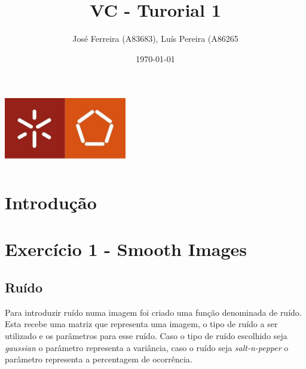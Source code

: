 \documentclass[a4paper]{report}
\begin{document}
\title{VC - Turorial 1}
\author{José Ferreira (A83683), Luís Pereira (A86265}
\date{\today}

\begin{center}
    \begin{minipage}{0.75\linewidth}
        \centering
        \includegraphics[width=0.4\textwidth]{images/eng.jpeg}\par\vspace{1cm}
        \vspace{1.5cm}
        \href{https://www.uminho.pt/PT}
        {\color{black}{\scshape\LARGE Universidade do Minho}} \par
        \vspace{1cm}
        \href{https://www.di.uminho.pt/}
        {\color{black}{\scshape\Large Departamento de Informática}} \par
        \vspace{1.5cm}
        \maketitle
    \end{minipage}
\end{center}

\tableofcontents

\pagebreak
\chapter{Introdução}

\chapter{Exercício 1 - Smooth Images}
\section{Ruído}
Para introduzir ruído numa imagem foi criado uma função denominada de ruído.
Esta recebe uma matriz que representa uma imagem, o tipo de ruído a ser
utilizado e os parâmetros para esse ruído. Caso o tipo de ruído escolhido seja
\textit{gaussian} o parâmetro representa a variância, caso o ruído seja
\textit{salt-n-pepper} o parâmetro representa a percentagem de ocorrência.
\end{document}
